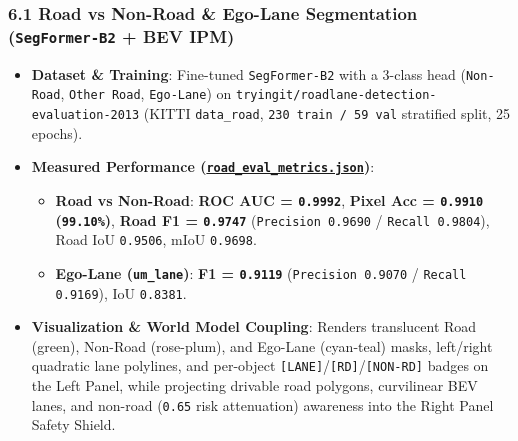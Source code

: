 \documentclass[10.5pt,a4paper]{article}
\begin{document}
\subsubsection{6.1 Road vs Non-Road \& Ego-Lane Segmentation (\texttt{SegFormer-\allowbreak{}B2} + BEV IPM)}
\begin{itemize}[leftmargin=1.5em,itemsep=2pt]
\item \textbf{Dataset \& Training}: Fine-tuned \texttt{SegFormer-\allowbreak{}B2} with a 3-class head (\texttt{Non-\allowbreak{}Road}, \texttt{Other Road}, \texttt{Ego-\allowbreak{}Lane}) on \texttt{tryingit/\allowbreak{}roadlane-\allowbreak{}detection-\allowbreak{}evaluation-\allowbreak{}2013} (KITTI \texttt{data\_\allowbreak{}road}, \texttt{230 train /\allowbreak{} 59 val} stratified split, 25 epochs).
\item \textbf{Measured Performance (\href{https://github.com/Heisnotanimposter/Totalcare\_autonomous\_driving\_Yolov5/blob/main/results/v4\_road\_lane/road\_outputs/road\_lane\_outputs/road\_eval\_metrics.json}{\texttt{road\_\allowbreak{}eval\_\allowbreak{}metrics.\allowbreak{}json}})}:
\begin{itemize}[leftmargin=1.5em,itemsep=2pt]
\item \textbf{Road vs Non-Road}: \textbf{ROC AUC = \texttt{0.\allowbreak{}9992}}, \textbf{Pixel Acc = \texttt{0.\allowbreak{}9910} (\texttt{99.\allowbreak{}10\%})}, \textbf{Road F1 = \texttt{0.\allowbreak{}9747}} (\texttt{Precision 0.\allowbreak{}9690} / \texttt{Recall 0.\allowbreak{}9804}), Road IoU \texttt{0.\allowbreak{}9506}, mIoU \texttt{0.\allowbreak{}9698}.
\item \textbf{Ego-Lane (\texttt{um\_\allowbreak{}lane})}: \textbf{F1 = \texttt{0.\allowbreak{}9119}} (\texttt{Precision 0.\allowbreak{}9070} / \texttt{Recall 0.\allowbreak{}9169}), IoU \texttt{0.\allowbreak{}8381}.
\end{itemize}
\item \textbf{Visualization \& World Model Coupling}: Renders translucent Road (green), Non-Road (rose-plum), and Ego-Lane (cyan-teal) masks, left/right quadratic lane polylines, and per-object \texttt{[LANE]}/\texttt{[RD]}/\texttt{[NON-\allowbreak{}RD]} badges on the Left Panel, while projecting drivable road polygons, curvilinear BEV lanes, and non-road (\texttt{0.\allowbreak{}65} risk attenuation) awareness into the Right Panel Safety Shield.
\end{itemize}
\end{document}

